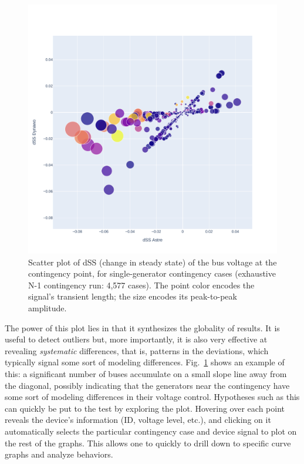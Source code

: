 \documentclass[conference]{IEEEtran}
\begin{document}
\begin{figure}
  \centering
  \includegraphics[width=\columnwidth]{figs/Ubus_dSS_GENS_20210211-0930_moreT600}
  \caption{Scatter plot of dSS (change in steady state) of the bus
    voltage at the contingency point, for single-generator contingency
    cases (exhaustive N-1 contingency run: 4,577 cases). The point
    color encodes the signal's transient length; the size encodes its
    peak-to-peak amplitude.}
  \label{fig:bubbleplot1}
\end{figure}

The power of this plot lies in that it synthesizes the globality of results.  It
is useful to detect outliers but, more importantly, it is also very effective at
revealing \emph{systematic} differences, that is, patterns in the deviations,
which typically signal some sort of modeling
differences. Fig.~\ref{fig:bubbleplot1} shows an example of this: a significant
number of buses accumulate on a small slope line away from the diagonal,
possibly indicating that the generators near the contingency have some sort of
modeling differences in their voltage control. Hypotheses such as this can
quickly be put to the test by exploring the plot. Hovering over each point
reveals the device's information (ID, voltage level, etc.), and clicking on it
automatically selects the particular contingency case and device signal to plot
on the rest of the graphs. This allows one to quickly to drill down to specific
curve graphs and analyze behaviors.
\end{document}
